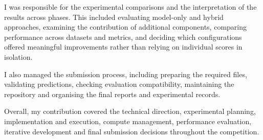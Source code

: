 \documentclass[11pt, oneside]{article}
\begin{document}
\noindent
I was responsible for the experimental comparisons and the interpretation of the results across phases.
This included evaluating model-only and hybrid approaches, examining the contribution of additional
components, comparing performance across datasets and metrics, and deciding which configurations offered
meaningful improvements rather than relying on individual scores in isolation.

\noindent
I also managed the submission process, including preparing the required files, validating predictions,
checking evaluation compatibility, maintaining the repository and organising the final reports and
experimental records.

\noindent
Overall, my contribution covered the technical direction, experimental planning, implementation and
execution, compute management, performance evaluation, iterative development and final submission
decisions throughout the competition.

\vspace{1em}


\end{document}

